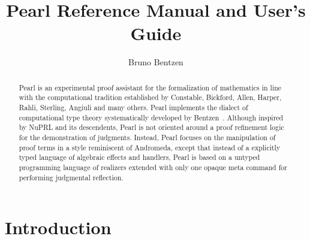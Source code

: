 \documentclass[a4paper]{article}
\title{\bfseries{Pearl Reference Manual and User's Guide}}
\author[1]{Bruno Bentzen}
\affil[1]{Zhejiang University, \protect\\ Hangzhou, 310058, P. R. China}
\affil[ ]{\texttt{bbentzen@zju.edu.cn}}
\date{}
\begin{document}
	
\maketitle


\begin{abstract}
	\noindent Pearl is an experimental proof assistant for the formalization of mathematics in line with the computational tradition established by Constable, Bickford, Allen, Harper, Rahli, Sterling, Angiuli and many others. Pearl implements the dialect of computational type theory systematically developed by Bentzen~\cite{bentzen2026book}. Although inspired by NuPRL and its descendents, Pearl is not oriented around a proof refinement logic for the demonstration of judgments. Instead, Pearl focuses on the manipulation of proof terms in a style reminiscent of Andromeda, except that instead of a explicitly typed language of algebraic effects and handlers, Pearl is based on a untyped programming language of realizers extended with only one opaque meta command for performing judgmental reflection. 
\end{abstract}


\section{Introduction} \label{intro}
\end{document}
